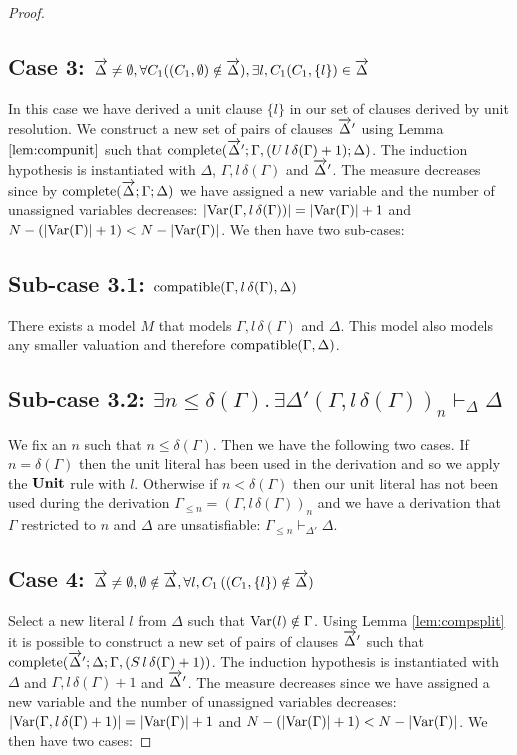 \begin{mytheorem}
\begin{proof}
\subsection*{Case 3: $\overrightarrow{\Delta} \neq \emptyset, \forall C_1 ((C_1, \emptyset) \notin \overrightarrow{\Delta}), \exists l,C_1 (C_1 , \{ l \}) \in \overrightarrow{\Delta} $}
In this case we have derived a unit clause $\{ l \}$ in our set of clauses derived by unit resolution.  We construct a new set of pairs of clauses $\overrightarrow{\Delta}'$ using Lemma $\ref{lem:compunit}$ such that $\mathrm{complete}(\overrightarrow{\Delta}';\Gamma, (U \, l \, \delta(\Gamma) + 1); \Delta)$. 
%
The induction hypothesis is instantiated with $\Delta$, $\Gamma, l \, \delta(\Gamma)$ and $\overrightarrow{\Delta}'$. The measure decreases since by $\mathrm{complete}(\overrightarrow{\Delta};\Gamma; \Delta)$ we have assigned a new variable and the number of unassigned variables decreases: $ |\mathrm{Var}(\Gamma, l \, \delta(\Gamma))| = |\mathrm{Var}(\Gamma)| + 1$ and $N - (|\mathrm{Var}(\Gamma)| + 1) <  N - |\mathrm{Var}(\Gamma)|$.   We then have two sub-cases: 
%
\subsection*{Sub-case 3.1: $\mathrm{compatible}(\Gamma, l \, \delta(\Gamma),\Delta)$}
There exists a model $M$ that models $\Gamma, l \, \delta(\Gamma)$ and $\Delta$. This model also models any smaller valuation and therefore $\mathrm{compatible}(\Gamma,\Delta)$.
\subsection*{Sub-case 3.2: $\exists n \leq \delta(\Gamma). \, \exists \Delta' (\Gamma, l \, \delta(\Gamma))_n \vdash_{\Delta} \Delta$}
We fix an $n$ such that $n \leq \delta(\Gamma)$. Then we have the following two cases. If $n = \delta(\Gamma)$ then the unit literal has been used in the derivation and so we apply the $\mathbf{Unit}$ rule with $l$. Otherwise if $n < \delta(\Gamma)$ 
then our unit literal has not been used during the derivation $\Gamma_{\leq n} = (\Gamma, l \, \delta(\Gamma))_n$ and we have a derivation that $\Gamma$ restricted to $n$ and $\Delta$ are unsatisfiable: $\Gamma_{\leq n} \vdash_{\Delta'} \Delta$.
%
\subsection*{Case 4: $\overrightarrow{\Delta} \neq \emptyset, \emptyset \notin \overrightarrow{\Delta},  \forall l,C_1 \, ( (C_1 , \{ l \})  \notin \overrightarrow{\Delta} )$}
Select a new literal $l$ from $\Delta$ such that $\mathrm{Var}(l) \notin \Gamma$. Using Lemma \ref{lem:compsplit} it is possible to construct a new set of pairs of clauses $\overrightarrow{\Delta}'$ such that $\mathrm{complete}(\overrightarrow{\Delta}';\Delta; \Gamma, (S \, l \, \delta(\Gamma) + 1))$.
The induction hypothesis is instantiated with $\Delta$ and $ \Gamma, l \, \delta(\Gamma) + 1$ and $\overrightarrow{\Delta}'$. The measure decreases since we have assigned a new variable and the number of unassigned variables decreases: $ |\mathrm{Var}(\Gamma, l \, \delta(\Gamma) + 1)| = |\mathrm{Var}(\Gamma)| + 1$ and $N - (|\mathrm{Var}(\Gamma)| + 1) <  N - |\mathrm{Var}(\Gamma)|$.  We then have two cases:
%

\end{proof}
\end{mytheorem}
